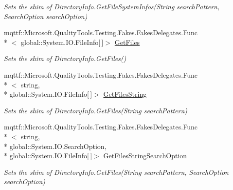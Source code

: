 \begin{DoxyCompactItemize}
\begin{DoxyCompactList}\small\item\em Sets the shim of Directory\-Info.\-Get\-File\-System\-Infos(\-String search\-Pattern, Search\-Option search\-Option)\end{DoxyCompactList}\item 
mqttf\-::\-Microsoft.\-Quality\-Tools.\-Testing.\-Fakes.\-Fakes\-Delegates.\-Func\\*
$<$ global\-::\-System.\-I\-O.\-File\-Info\mbox{[}$\,$\mbox{]}$>$ \hyperlink{class_system_1_1_i_o_1_1_fakes_1_1_shim_directory_info_a53e206e13345c6a078b1db7f1ef1b651}{Get\-Files}
\begin{DoxyCompactList}\small\item\em Sets the shim of Directory\-Info.\-Get\-Files()\end{DoxyCompactList}\item 
mqttf\-::\-Microsoft.\-Quality\-Tools.\-Testing.\-Fakes.\-Fakes\-Delegates.\-Func\\*
$<$ string, \\*
global\-::\-System.\-I\-O.\-File\-Info\mbox{[}$\,$\mbox{]}$>$ \hyperlink{class_system_1_1_i_o_1_1_fakes_1_1_shim_directory_info_a0879b480cce9e5a7b5419764765a749b}{Get\-Files\-String}
\begin{DoxyCompactList}\small\item\em Sets the shim of Directory\-Info.\-Get\-Files(\-String search\-Pattern)\end{DoxyCompactList}\item 
mqttf\-::\-Microsoft.\-Quality\-Tools.\-Testing.\-Fakes.\-Fakes\-Delegates.\-Func\\*
$<$ string, \\*
global\-::\-System.\-I\-O.\-Search\-Option, \\*
global\-::\-System.\-I\-O.\-File\-Info\mbox{[}$\,$\mbox{]}$>$ \hyperlink{class_system_1_1_i_o_1_1_fakes_1_1_shim_directory_info_a61b1fed653e42cd8a079b6dc3083f6af}{Get\-Files\-String\-Search\-Option}
\begin{DoxyCompactList}\small\item\em Sets the shim of Directory\-Info.\-Get\-Files(\-String search\-Pattern, Search\-Option search\-Option)\end{DoxyCompactList}\item 

\end{DoxyCompactItemize}
